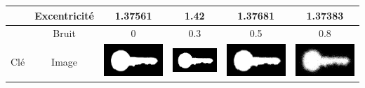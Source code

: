\documentclass{article}
\theoremstyle{definition}
\begin{document}
\begin{table}[!h]
\begin{tabular}{|c|c|c|c|c|c|}
	    \cline{2-6}
	    & Excentricité & 1.37561 & 1.42 & 1.37681 & 1.37383 \\
	    \hline
	    \hline
	    & Bruit & 0 & 0.3 & 0.5 & 0.8 \\
	    \cline{2-6}
	    Clé & Image & \includegraphics[scale=0.15]{Illustrations/key-6.png} & \includegraphics[scale=0.15]{Illustrations/key-6(3).png} & \includegraphics[scale=0.15]{Illustrations/key-6(5).png} & \includegraphics[scale=0.15]{Illustrations/key-6(8).png} \\

\end{tabular}
\end{table}
\end{document}
